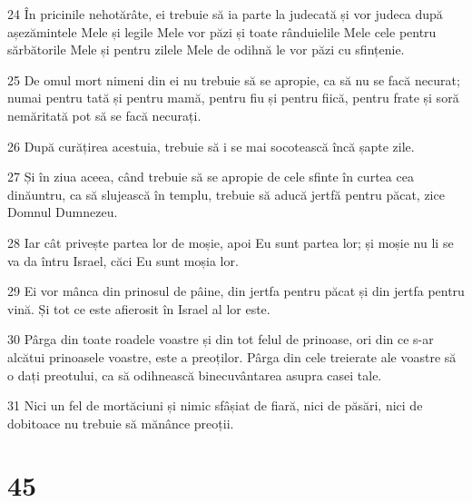 \par 24 În pricinile nehotărâte, ei trebuie să ia parte la judecată și vor judeca după așezămintele Mele și legile Mele vor păzi și toate rânduielile Mele cele pentru sărbătorile Mele și pentru zilele Mele de odihnă le vor păzi cu sfințenie.
\par 25 De omul mort nimeni din ei nu trebuie să se apropie, ca să nu se facă necurat; numai pentru tată și pentru mamă, pentru fiu și pentru fiică, pentru frate și soră nemăritată pot să se facă necurați.
\par 26 După curățirea acestuia, trebuie să i se mai socotească încă șapte zile.
\par 27 Și în ziua aceea, când trebuie să se apropie de cele sfinte în curtea cea dinăuntru, ca să slujească în templu, trebuie să aducă jertfă pentru păcat, zice Domnul Dumnezeu.
\par 28 Iar cât privește partea lor de moșie, apoi Eu sunt partea lor; și moșie nu li se va da întru Israel, căci Eu sunt moșia lor.
\par 29 Ei vor mânca din prinosul de pâine, din jertfa pentru păcat și din jertfa pentru vină. Și tot ce este afierosit în Israel al lor este.
\par 30 Pârga din toate roadele voastre și din tot felul de prinoase, ori din ce s-ar alcătui prinoasele voastre, este a preoților. Pârga din cele treierate ale voastre să o dați preotului, ca să odihnească binecuvântarea asupra casei tale.
\par 31 Nici un fel de mortăciuni și nimic sfâșiat de fiară, nici de păsări, nici de dobitoace nu trebuie să mănânce preoții.

\chapter{45}

